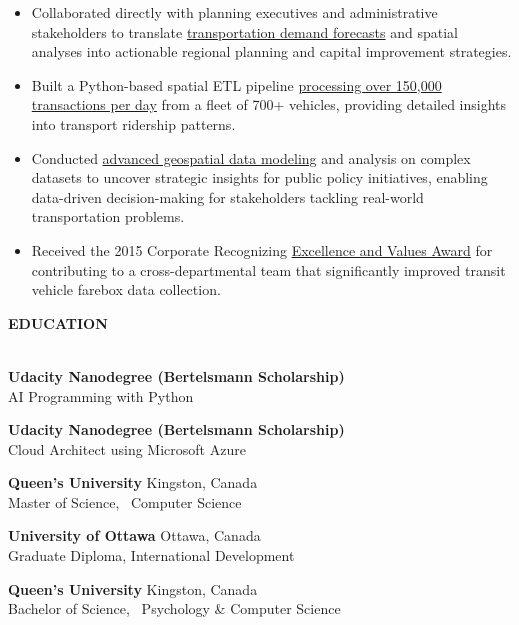 \documentclass[letterpaper]{article}
\newcommand{\lineunder} {
        \vspace*{-8pt} \\
        \hspace*{-18pt} \hrulefill \\
    }
\newcommand{\header} [1] {
        \vspace{9pt}
        {\hspace*{-18pt}\vspace*{6pt} \large \textbf {#1}}
        \vspace*{-6pt} \lineunder
        \vspace{2pt}
    }
\newenvironment{jobtasklist}
        {
            \vspace{-12pt}
            \begin{itemize} \itemsep 0pt
        }{
            \end{itemize}
            \vspace{-3pt}
        }
\newcommand{\university}[3]{
        \textbf{#1}  %
        \hfill #2\\  %
        #3\\         %
        \vspace{2mm}
    }
\newcommand{\impt}[1]{\uline{#1}}
\begin{document}
\begin{jobtasklist}
    \item Collaborated directly with planning executives and administrative stakeholders to translate
            \impt{transportation demand forecasts} and spatial analyses into actionable regional planning
            and capital improvement strategies.
    \item Built a Python-based spatial ETL pipeline
            \impt{processing over 150,000 transactions per day}
            from a fleet of 700+ vehicles, providing detailed insights into transport ridership patterns.
    \item Conducted \impt{advanced geospatial data modeling} and analysis on complex datasets
            to uncover strategic insights for public policy initiatives,
            enabling data-driven decision-making for stakeholders tackling real-world transportation problems.
    \item Received the 2015 Corporate Recognizing \impt{Excellence and Values Award}
            for contributing to a cross-departmental team that significantly
            improved transit vehicle farebox data collection.
\end{jobtasklist}


\vspace{25pt}

\header{EDUCATION}
    \university
        {Udacity Nanodegree (Bertelsmann Scholarship)}
        {}
        {AI Programming with Python}
    \university
        {Udacity Nanodegree (Bertelsmann Scholarship)}
        {}
        {Cloud Architect using Microsoft Azure}
    \university
        {Queen's University}
        {Kingston, Canada}
        {Master of Science, ~Computer Science}

    \university
        {University of Ottawa}
        {Ottawa, Canada}
        {Graduate Diploma, International Development}

    \university
        {Queen's University}
        {Kingston, Canada}
        {Bachelor of Science, ~Psychology \& Computer Science}
\end{document}
